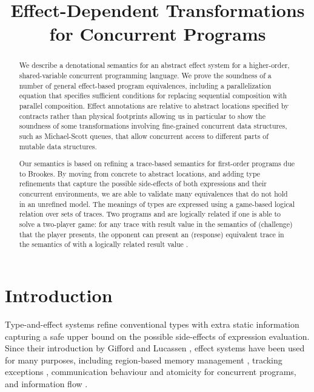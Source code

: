 \documentclass[nocopyrightspace,preprint]{sigplanconf}
\title{Effect-Dependent Transformations for Concurrent Programs}
\newcommand{\squelch}[1]{}
\begin{document}
\maketitle
\begin{abstract}  
We describe a denotational semantics for an abstract effect
system for a higher-order, shared-variable concurrent programming
language. We prove the soundness of a number of general effect-based
program equivalences, including a parallelization equation that
specifies sufficient conditions for replacing sequential composition
with parallel composition. Effect annotations are relative to abstract 
locations specified by contracts rather than physical footprints allowing us 
in particular to show the soundness of
some transformations involving fine-grained concurrent data structures, such as
Michael-Scott queues, that allow concurrent access to different parts
of mutable data structures.

Our semantics is based on refining a trace-based semantics for
first-order programs due to Brookes. By moving from concrete to
abstract locations, and adding type refinements that capture the
possible side-effects of both expressions and their concurrent
environments, we are able to validate many equivalences that do not
hold in an unrefined model.  The meanings of types are expressed using
a game-based logical relation over sets of traces. Two programs 
and  are logically related if one is able to solve a two-player
game: for any trace with result value  in the semantics of 
(challenge) that the player presents, the opponent can present an
(response) equivalent trace in the semantics of  with a logically related result value .

\end{abstract}
\squelch{
\category{F.3.2}{Logic and Meanings of Programs}{Semantics of Programming Languages -- Denotational semantics, Program analysis}
\category{F.3.2}{Logic and Meanings of Programs}{Studies of Program Constructs -- Type structure}
\terms
Languages, Theory
\keywords
Type and effect systems, region analysis, logical relations, parametricity, program transformation
}
\noindent
\section{Introduction}
\label{sec:intro}
Type-and-effect systems refine conventional types with extra
static information capturing a safe upper bound on the possible
side-effects of expression evaluation. Since their introduction by
Gifford and Lucassen \cite{DBLP:conf/lfp/GiffordL86},
effect systems have been used for many purposes, including
region-based memory management \cite{birkedaltoftevejlstrup}, tracking
exceptions \cite{pessauxleroy,bentonbuchlovsky}, communication
behaviour \cite{amtoftnielsons} and atomicity
\cite{flanaganqadeerpldi03} for concurrent programs, and information
flow \cite{brobergsands:flowlocks}. 
\end{document}
